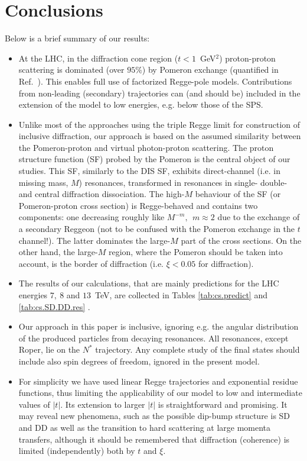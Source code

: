\documentclass[12pt]{article}
\begin{document}
\section{Conclusions}\label{sec:Conclusions}
Below is a brief summary of our results:
\begin{itemize}
 \item At the LHC, in the diffraction cone region ($t<1$~GeV$^2$) proton-proton scattering is dominated (over $95 \%$) by Pomeron exchange (quantified in Ref.~\cite{JLL}). This enables full use of factorized Regge-pole models. Contributions from non-leading (secondary) trajectories can (and should be) included in the extension of the model to low energies, e.g. below those of the SPS.

 \item Unlike most of the approaches using the triple Regge limit for construction of inclusive diffraction, our approach is based on the assumed similarity between the Pomeron-proton and virtual photon-proton scattering. The proton structure function (SF) probed by the Pomeron is the central object of our studies. This SF, similarly to the DIS SF, exhibits direct-channel (i.e. in missing mass, $M$) resonances, transformed in resonances in single- double- and central diffraction dissociation. The high-$M$ behaviour of the SF (or Pomeron-proton cross section) is Regge-behaved and contains two components: one decreasing roughly like $M^{-m},\ \ m\approx 2$ due to the exchange of a secondary Reggeon 
 (not to be confused with the Pomeron exchange in the $t$ channel!). The latter dominates the large-$M$ part of the cross sections.
On the other hand, the large-$M$ region, where the Pomeron should be taken into account, is the border
of diffraction (i.e. $\xi<0.05$ for diffraction).

 \item The results of our calculations, that are mainly predictions for the LHC energies $7,\ 8$ and $13$~TeV, are collected in Tables \ref{tab:cs.predict} and \ref{tab:cs.SD.DD.res} .


 \item Our approach in this paper is inclusive, ignoring e.g. the angular distribution of the produced particles from decaying resonances.
All resonances, except Roper, lie on the $N^*$ trajectory. Any complete study of the final states should include also spin degrees of freedom, ignored in the present model.

 \item For simplicity we have used linear Regge trajectories and exponential residue functions, thus limiting the applicability of our model to low and intermediate values of $|t|$. Its extension to larger $|t|$ is straightforward and promising. It may reveal new phenomena, such as the possible dip-bump structure is SD and DD as well as the transition to hard scattering at large momenta transfers, although it should be remembered that
diffraction (coherence) is limited (independently) both by $t$ and $\xi$.


\end{itemize}
\end{document}
